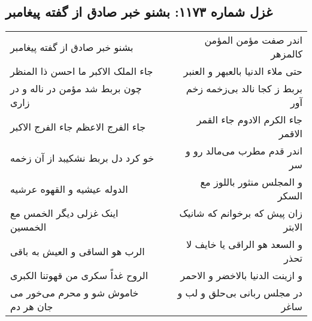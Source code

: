 \begin{center}
\section*{غزل شماره ۱۱۷۳: بشنو خبر صادق از گفته پیغامبر}
\label{sec:1173}
\begin{longtable}{l p{0.5cm} r}
بشنو خبر صادق از گفته پیغامبر
&&
اندر صفت مؤمن المؤمن کالمزهر
\\
جاء الملک الاکبر ما احسن ذا المنظر
&&
حتی ملاء الدنیا بالعبهر و العنبر
\\
چون بربط شد مؤمن در ناله و در زاری
&&
بربط ز کجا نالد بی‌زخمه زخم آور
\\
جاء الفرج الاعظم جاء الفرج الاکبر
&&
جاء الکرم الادوم جاء القمر الاقمر
\\
خو کرد دل بربط نشکیبد از آن زخمه
&&
اندر قدم مطرب می‌مالد رو و سر
\\
الدوله عیشیه و القهوه عرشیه
&&
و المجلس منثور باللوز مع السکر
\\
اینک غزلی دیگر الخمس مع الخمسین
&&
زان پیش که برخوانم که شانیک الابتر
\\
الرب هو الساقی و العیش به باقی
&&
و السعد هو الراقی یا خایف لا تحذر
\\
الروح غداً سکری من قهوتنا الکبری
&&
و ازینت الدنیا بالاخضر و الاحمر
\\
خاموش شو و محرم می‌خور می جان هر دم
&&
در مجلس ربانی بی‌حلق و لب و ساغر
\\
\end{longtable}
\end{center}
